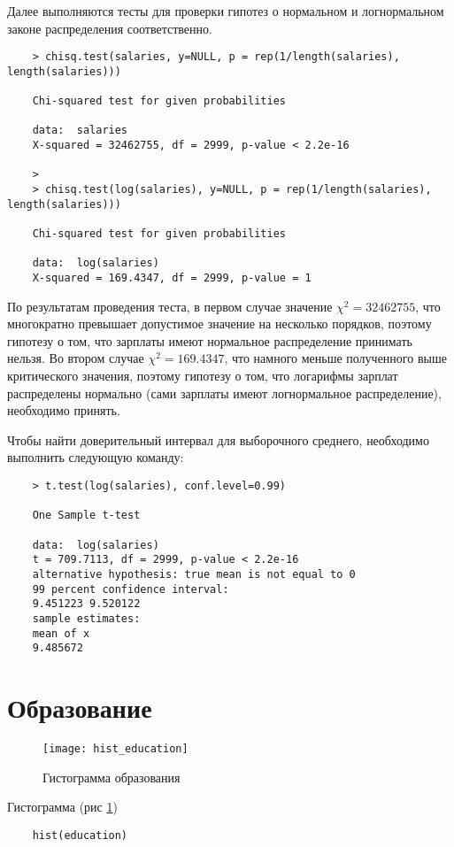 \documentclass[12pt,a4paper,titlepage]{article}
\begin{document}
  Далее выполняются тесты для проверки гипотез о нормальном и логнормальном законе распределения соответственно.
  \begin{lstlisting}
    > chisq.test(salaries, y=NULL, p = rep(1/length(salaries), length(salaries)))

    Chi-squared test for given probabilities

    data:  salaries
    X-squared = 32462755, df = 2999, p-value < 2.2e-16

    >
    > chisq.test(log(salaries), y=NULL, p = rep(1/length(salaries), length(salaries)))

    Chi-squared test for given probabilities

    data:  log(salaries)
    X-squared = 169.4347, df = 2999, p-value = 1
  \end{lstlisting}

  По результатам проведения теста, в первом случае значение $\chi^2 = 32462755$, что многократно превышает допустимое значение на несколько порядков, поэтому гипотезу о том, что зарплаты имеют нормальное распределение принимать нельзя.
  Во втором случае $\chi^2 = 169.4347$, что намного меньше полученного выше критического значения, поэтому гипотезу о том, что логарифмы зарплат распределены нормально (сами зарплаты имеют логнормальное распределение), необходимо принять.

  Чтобы найти доверительный интервал для выборочного среднего, необходимо выполнить следующую команду:

  \begin{lstlisting}
    > t.test(log(salaries), conf.level=0.99)

    One Sample t-test

    data:  log(salaries)
    t = 709.7113, df = 2999, p-value < 2.2e-16
    alternative hypothesis: true mean is not equal to 0
    99 percent confidence interval:
    9.451223 9.520122
    sample estimates:
    mean of x 
    9.485672
  \end{lstlisting}

\section{Образование}
  \begin{figure}
    \texttt{[image: hist\_education]}
    \caption{Гистограмма образования}
    \label{education_hist}
  \end{figure}

  Гистограмма (рис \ref{education_hist})
  \begin{lstlisting}
    hist(education)
  \end{lstlisting}
\end{document}
